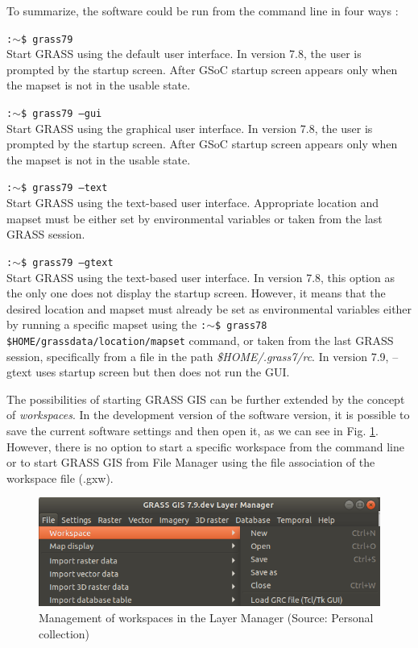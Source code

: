 \documentclass[a4paper,10pt,twoside]{article}
\begin{document}
 \noindent To summarize, the software could be run from the command line in four ways \cite{startup}:

\noindent \texttt{:$\sim$\$ grass79} \\
\noindent Start GRASS using the default user interface. In version 7.8, the user is prompted by the startup screen. After GSoC startup screen appears only when the mapset is not in the usable state.

\noindent \texttt{:$\sim$\$ grass79 --gui}\\
\noindent Start GRASS using the graphical user interface.  In version 7.8, the user is prompted by the startup screen. After GSoC startup screen appears only when the mapset is not in the usable state.

\noindent \texttt{:$\sim$\$ grass79 --text} \\
\noindent Start GRASS using the text-based user interface. Appropriate location and mapset must be either set by environmental variables or taken from the last GRASS session.

\noindent \texttt{:$\sim$\$ grass79 --gtext} \\
\noindent Start GRASS using the text-based user interface.  In version 7.8, this option as the only one does not display the startup screen. However, it means that the desired location and mapset must already be set as environmental variables either by running a specific mapset using the \texttt{:$\sim$\$ grass78 \$HOME/grassdata/location/mapset} command, or taken from the last GRASS session, specifically from a file in the path \textit{\$HOME/.grass7/rc}. In version 7.9, --gtext uses startup screen but then does not run the GUI.

The possibilities of starting GRASS GIS can be further extended by the concept of \textit{workspaces}. In the development version of the software version, it is possible to save the current software settings and then open it, as we can see in Fig. \ref {fig:workspace_grass}. However, there is no option to start a specific workspace from the command line or to start GRASS GIS from File Manager using the file association of the workspace file (.gxw).

\vspace{0.3cm}
\begin{figure}[hbt!] 
\begin{center}
\includegraphics[width=12cm]{../pictures/workspace_grass.png} 
\caption[Management of workspaces in the Layer Manager]{Management of workspaces in the Layer Manager (Source: Personal collection)}
\label{fig:workspace_grass}
\end{center}
\end{figure}
\end{document}
